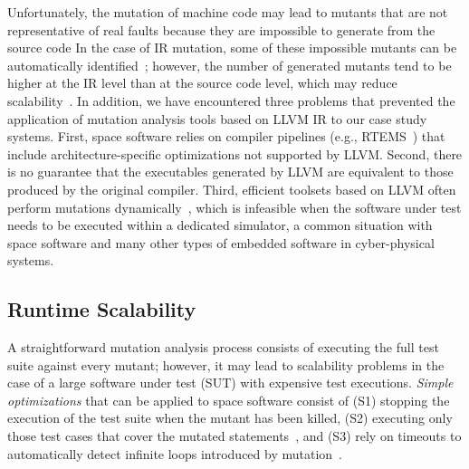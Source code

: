 Unfortunately, the mutation of machine code 
may lead to mutants that are not representative of real faults  because they are impossible to generate from the source code
In the case of IR mutation, some of these impossible mutants can be automatically identified~\cite{denisov2018mull}; however,
the number of generated mutants tend to be higher at the IR level than at the source code level, which may reduce scalability~\cite{hariri2019comparing}.
 In addition, we have encountered three problems that prevented the application of 
 mutation analysis tools based on LLVM IR to our case study systems.
First, space software relies on compiler pipelines (e.g., RTEMS~\cite{RTEMS}) that include architecture-specific optimizations not supported by LLVM. 
Second, there is no guarantee that the executables generated by LLVM are equivalent to those produced by the original compiler.
 Third, efficient toolsets based on LLVM often perform mutations dynamically~\cite{denisov2018mull}, which is infeasible when the software under test needs to be executed within a dedicated simulator, a common situation with space software and many other types of embedded software in cyber-physical systems.




\subsection{Runtime Scalability}
\label{sec:scalability}

A straightforward mutation analysis process consists of executing the full test suite against every mutant; however, it may lead to scalability problems in the case of a large software under test (SUT) with expensive test executions.
\emph{Simple optimizations} that can be applied to space software consist of (S1) stopping the execution of the test suite when the mutant has been killed, (S2) executing only those test cases that cover the mutated statements~\cite{delamaro1996proteum}, and (S3) rely on timeouts to automatically detect infinite loops introduced by mutation~\cite{papadakis2019mutation}. 

